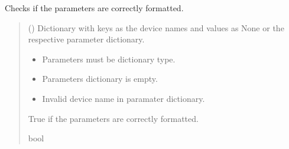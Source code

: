 \documentclass[letterpaper,10pt,english]{sphinxmanual}
\begin{document}
\begin{fulllineitems}
\begin{fulllineitems}
\label{\detokenize{Setup_PodDevices:Setup_PodDevices.Setup_PodDevices._CheckForValidParams}}
\pysigstartsignatures
{}
\pysigstopsignatures
\sphinxAtStartPar
Checks if the parameters are correctly formatted.
\begin{quote}\begin{description}
\sphinxAtStartPar
{} (\sphinxstyleliteralemphasis{\sphinxupquote{{[}}}\sphinxstyleliteralemphasis{\sphinxupquote{,}}\sphinxstyleliteralemphasis{\sphinxupquote{ | }}\sphinxstyleliteralemphasis{\sphinxupquote{{]}}}) \textendash{} Dictionary with keys as the device names and                 values as None or the respective parameter dictionary.

\begin{itemize}
\item {} 
\sphinxAtStartPar
{} \textendash{} Parameters must be dictionary type.

\item {} 
\sphinxAtStartPar
{} \textendash{} Parameters dictionary is empty.

\item {} 
\sphinxAtStartPar
{} \textendash{} Invalid device name in paramater dictionary.

\end{itemize}

\sphinxAtStartPar
True if the parameters are correctly formatted.

\sphinxAtStartPar
bool

\end{description}\end{quote}

\end{fulllineitems}


\end{fulllineitems}
\end{document}
